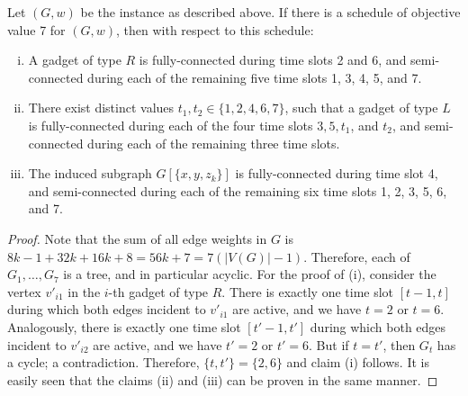 \documentclass[runningheads]{llncs}
\newcommand{\set}[1]{\{ #1 \}}
\begin{document}
\begin{lemma}
\label{lemma:gadgets_properties}
Let $(G, w)$ be the instance as described above. If there is a schedule of objective value 7 for $(G, w)$, then with respect to this schedule:
\begin{enumerate}[(i)]
\item A gadget of type $R$ is fully-connected during time slots 2 and 6, and semi-connected during each of the remaining five time slots 1, 3, 4, 5, and 7.
\item There exist distinct values $t_1, t_2 \in \set{1,2,4,6,7}$, such that a gadget of type $L$ is fully-connected during each of the four time slots $3,5,t_1$, and $t_2$, and semi-connected during each of the remaining three time slots.
\item The induced subgraph $G[\set{x, y, z_k}]$ is fully-connected during time slot 4, and semi-connected during each of the remaining six time slots 1, 2, 3, 5, 6, and 7.
\end{enumerate}
\end{lemma}
\begin{proof}
 Note that the sum of all edge weights in $G$ is $8k - 1 + 32k + 16k + 8 = 56k + 7 = 7(|V(G)| - 1)$. Therefore, each of $G_{1}, \ldots, G_{7}$ is a tree, and in particular acyclic. For the proof of (i), consider the vertex $v'_{i1}$ in the $i$-th gadget of type $R$. There is exactly one time slot $[t-1, t]$ during which both edges incident to $v'_{i1}$ are active, and we have $t = 2$ or $t = 6$. Analogously, there is exactly one time slot $[t'-1, t']$ during which both edges incident to $v'_{i2}$ are active, and we have $t' = 2$ or $t' = 6$. But if $t = t'$, then $G_t$ has a cycle; a contradiction. Therefore, $\set{t, t'} = \set{2, 6}$ and claim (i) follows. It is easily seen that the claims (ii) and (iii) can be proven in the same manner. 
\end{proof}
\end{document}
